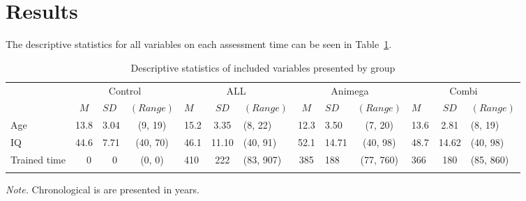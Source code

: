 \documentclass[
  english,
  ,man]{apa6}
\begin{document}
\hypertarget{results}{%
\section{Results}\label{results}}

The descriptive statistics for all variables on each assessment time can be seen in Table~\ref{tab:descriptives-table}.

\begin{table}[tbp]

\begin{center}
\begin{threeparttable}

\caption{\label{tab:descriptives-table}Descriptive statistics of included variables presented by group}

\small{

\begin{tabular}{lclclclclclcl}
\toprule
 & \multicolumn{3}{c}{Control} & \multicolumn{3}{c}{ALL} & \multicolumn{3}{c}{Animega} & \multicolumn{3}{c}{Combi} \\
\cmidrule(r){2-4} \cmidrule(r){5-7} \cmidrule(r){8-10} \cmidrule(r){11-13}
  & $M$ & $SD$ & $(Range)$ & $M$ & $SD$ & $(Range)$ & $M$ & $SD$ & $(Range)$ & $M$ & $SD$ & $(Range)$\\
\midrule
Age & 13.8 & 3.04 & (9, 19) & 15.2 & 3.35 & (8, 22) & 12.3 & 3.50 & (7, 20) & 13.6 & 2.81 & (8, 19)\\
IQ & 44.6 & 7.71 & (40, 70) & 46.1 & 11.10 & (40, 91) & 52.1 & 14.71 & (40, 98) & 48.7 & 14.62 & (40, 98)\\
Trained time & \ \ 0 & \ \ 0 & (0, 0) & 410 & 222 & (83, 907) & 385 & 188 & (77, 760) & 366 & 180 & (85, 860)\\
\bottomrule
\addlinespace
\end{tabular}

}

\begin{tablenotes}[para]
\normalsize{\textit{Note.} Chronological is are presented in years.}
\end{tablenotes}

\end{threeparttable}
\end{center}

\end{table}
\end{document}
